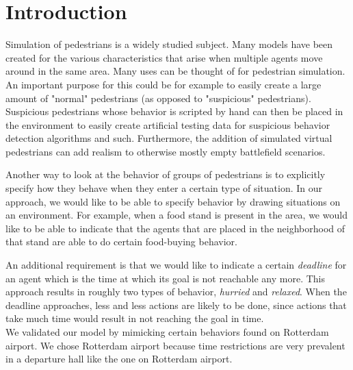 \documentclass[11pt]{article}
\begin{document}
\listoftodos
\maketitle

\abstract
\tableofcontents
\newpage

\section{Introduction}
Simulation of pedestrians is a widely studied subject. Many models have been created for the various characteristics that arise when multiple agents move around in the same area. Many uses can be thought of for pedestrian simulation. An important purpose for this could be for example to easily create a large amount of "normal" pedestrians (as opposed to "suspicious" pedestrians).  Suspicious pedestrians whose behavior is scripted by hand can then be placed in the environment to easily create artificial testing data for suspicious behavior detection algorithms and such. Furthermore, the addition of simulated virtual pedestrians can add realism to otherwise mostly empty battlefield scenarios.

Another way to look at the behavior of groups of pedestrians is to explicitly specify how they behave when they enter a certain type of situation. In our approach, we would like to be able to specify behavior by drawing situations on an environment. For example, when a food stand is present in the area, we would like to be able to indicate that the agents that are placed in the neighborhood of that stand are able to do certain food-buying behavior.

An additional requirement is that we would like to indicate a certain \emph{deadline} for an agent which is the time at which its goal is not reachable any more. This approach results in roughly two types of behavior, \emph{hurried} and \emph{relaxed}. When the deadline approaches, less and less actions are likely to be done, since actions that take much time would result in not reaching the goal in time.\\
We validated our model by mimicking certain behaviors found on Rotterdam airport. We chose Rotterdam airport because time restrictions are very prevalent in a departure hall like the one on Rotterdam airport.


\end{document}
